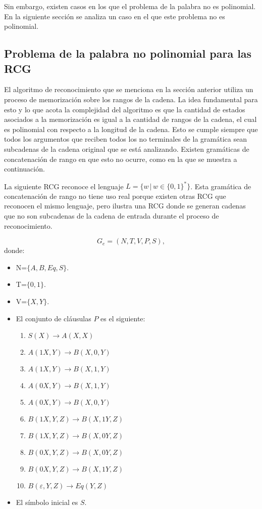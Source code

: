 \documentclass[12pt]{article}
\begin{document}
Sin embargo, existen casos en los que el problema de la palabra no es polinomial. En la siguiente sección se analiza un caso en el que este problema no es polinomial.

\subsection{Problema de la palabra no polinomial para las RCG}

El algoritmo de reconocimiento que se menciona en la sección anterior utiliza un proceso de memorización sobre los rangos de la cadena.  La idea fundamental para esto y lo que acota la complejidad del algoritmo es que la cantidad de estados asociados a la memorización es igual a la cantidad de rangos de la cadena, el cual es polinomial con respecto a la longitud de la cadena. Esto se cumple siempre que todos los argumentos que reciben todos los no terminales de la gramática sean subcadenas de la cadena original que se está analizando. Existen gramáticas de concatenación de rango en que esto no ocurre, como en la que se muestra a continuación.

La siguiente RCG reconoce el lenguaje $L=\{w\,|\,w\in\{0,1\}^*\}$. Esta gramática de concatenación de rango no tiene uso real porque existen otras RCG que reconocen el mismo lenguaje, pero ilustra una RCG donde se generan cadenas que no son subcadenas de la cadena de entrada durante el proceso de reconocimiento.

\[
    G_e = (N, T, V, P, S),
\]
donde:

\begin{itemize}
    \item  N=$\{A,B,Eq,S\}$.
    \item T=$\{0,1\}$.
    \item V=$\{X,Y\}$.
    \item El conjunto de cláusulas $P$ es el siguiente:
          \begin{enumerate}
              \item $S(X)\to A(X,X)$
              \item $A(1X,Y)\to B(X,0,Y)$
              \item $A(1X,Y)\to B(X,1,Y)$
              \item $A(0X,Y)\to B(X,1,Y)$
              \item $A(0X,Y)\to B(X,0,Y)$
              \item $B(1X,Y,Z)\to B(X,1Y,Z)$
              \item $B(1X,Y,Z)\to B(X,0Y,Z)$
              \item $B(0X,Y,Z)\to B(X,0Y,Z)$
              \item $B(0X,Y,Z)\to B(X,1Y,Z)$
              \item $B(\varepsilon,Y,Z)\to Eq(Y,Z)$
          \end{enumerate}
          
    \item El símbolo inicial es $S$.
\end{itemize}
\end{document}
